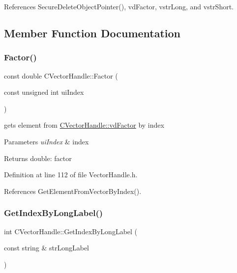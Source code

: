 References Secure\+Delete\+Object\+Pointer(), vd\+Factor, vstr\+Long, and vstr\+Short.



\subsection{Member Function Documentation}
\mbox{\label{classCVectorHandle_ae07ef54ee4ecb2da32176e58cf852e7c}} 
\subsubsection{\texorpdfstring{Factor()}{Factor()}}
{\footnotesize\ttfamily const double C\+Vector\+Handle\+::\+Factor (\begin{DoxyParamCaption}\item[{const unsigned int}]{ui\+Index }\end{DoxyParamCaption})\hspace{0.3cm}{\ttfamily [inline]}}



gets element from \hyperlink{classCVectorHandle_af8f8b2e0da8363e695872ca85f33364e}{C\+Vector\+Handle\+::vd\+Factor} by index 


\begin{DoxyParams}{Parameters}
{\em ui\+Index} & index \\
\hline
\end{DoxyParams}
\begin{DoxyReturn}{Returns}
double\+: factor 
\end{DoxyReturn}


Definition at line 112 of file Vector\+Handle.\+h.



References Get\+Element\+From\+Vector\+By\+Index().

\mbox{\label{classCVectorHandle_a36419c6f77002dde25bfa9e43357bd5c}} 
\subsubsection{\texorpdfstring{Get\+Index\+By\+Long\+Label()}{GetIndexByLongLabel()}}
{\footnotesize\ttfamily int C\+Vector\+Handle\+::\+Get\+Index\+By\+Long\+Label (\begin{DoxyParamCaption}\item[{const string \&}]{str\+Long\+Label }\end{DoxyParamCaption})\hspace{0.3cm}{\ttfamily [inline]}}



